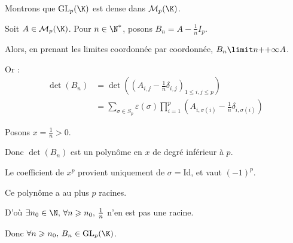 \begin{exemple}
    Montrons que $\operatorname{GL}_p(\K)$ est dense dans $\mathcal M_p(\K)$.

    Soit $A \in \mathcal M_p(\K)$.
    Pour $n \in \N^*$, posons $B_n = A - \frac 1 n I_p$.

    Alors, en prenant les limites coordonnée par coordonnée, $B_n \limit n {+ {+ \infty}} A$.

    Or :
    \begin{align*}
        \det(B_n) & = \det\left(\left(A_{i, j} - \frac 1 n \delta_{i, j}\right)_{1 \leqslant i, j \leqslant p}\right) \\
        & = \sum_{ \sigma \in S_p} \varepsilon(\sigma) \prod_{i=1}^p \left(A_{i, \sigma(i)} - \frac 1 n \delta_{i, \sigma(i)}\right) 
    \end{align*}

    Posons $x = \frac 1 n > 0$. 

    Donc $\det(B_n) $ est un polynôme en $x$ de degré inférieur à $p$. 

    Le coefficient de $x^p$ provient uniquement de $\sigma = \text{Id}$, et vaut $(-1)^p$.

    Ce polynôme a au plus $p$ racines. 

    D'où $\exists n_0 \in \N, \, \forall n \geqslant n_0, \, \frac 1 n$ n'en est pas une racine. 

    Donc $\forall n \geqslant n_0, \, B_n \in \operatorname{GL}_p(\K)$. \\
\end{exemple}

